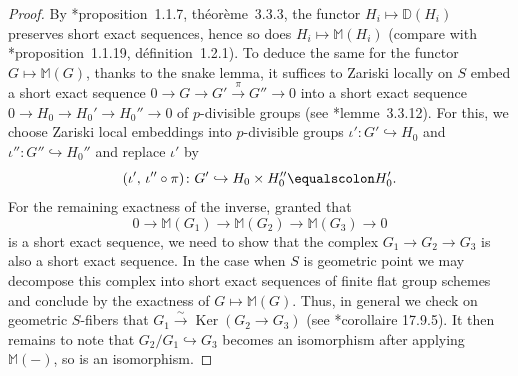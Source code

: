 \documentclass[11pt, reqno]{amsart}
\newcommand{\bD}{\mathbb{D}}
\newcommand{\bM}{\mathbb{M}}
\newcommand{\bZ}{\mathbb{Z}}
\DeclareMathOperator{\Ker}{Ker}		%
\newcommand{\cris}{{\mathrm{cris}}}		%
\newcommand{\et}{\mathrm{\acute{e}t}}	%
\newcommand{\hra}{\hookrightarrow}
\newcommand{\isomto}{\overset{\sim}{\longrightarrow}}
\newcommand{\ra}{\rightarrow}
\newcommand{\surjects}{\twoheadrightarrow}
\newcommand{\xra}{\xrightarrow}
\newcommand{\bpf}{\begin{proof}}
\newcommand{\epf}{\end{proof}}
\numberwithin{equation}{numberingbase}
\theoremstyle{thms}
\theoremstyle{claims}
\theoremstyle{defs}
\theoremstyle{thms}
\theoremstyle{defs}
\theoremstyle{subsection-tweak}
\theoremstyle{subsection-tweak}
\begin{document}
\bpf
By \cite{BBM82}*{proposition~1.1.7, th\'{e}or\`{e}me~3.3.3}, the functor $H_i \mapsto \bD(H_i)$ preserves short exact sequences, hence so does $H_i \mapsto \bM(H_i)$ (compare with \cite{BBM82}*{proposition~1.1.19, d\'{e}finition~1.2.1}). %
To deduce the same for the functor $G \mapsto \bM(G)$, thanks to the snake lemma, it suffices to Zariski locally on $S$ embed a short exact sequence $0 \ra G \ra G' \xra{\pi} G'' \ra 0$ into a short exact sequence $0 \ra H_0 \ra H_0' \ra H_0'' \ra 0$ of $p$-divisible groups (see \cite{BBM82}*{lemme~3.3.12}). For this, we choose Zariski local embeddings into $p$-divisible groups $\iota'\colon G' \hra H_0$ and $\iota'' \colon G'' \hra H_0''$ and replace $\iota'$ by 
\[
(\iota',\, \iota''\circ \pi)\colon G' \hra  H_0 \times H_0'' \equalscolon H_0'.
\] 
For the remaining exactness of the inverse, granted that 
\[
0 \ra \bM(G_1) \ra \bM(G_2) \ra \bM(G_3) \ra 0
\]
is a short exact sequence, we need to show that the complex $G_1 \ra G_2 \ra G_3$ is also a short exact sequence. In the case when $S$ is geometric point we may decompose this complex into short exact sequences of finite flat group schemes and conclude by the exactness of $G \mapsto \bM(G)$. Thus, in general we check on   geometric $S$-fibers that $G_1 \isomto \Ker(G_2 \ra G_3)$ (see \cite{EGAIV4}*{corollaire 17.9.5}). It then remains to note that $G_2/G_1 \hra G_3$ becomes an isomorphism after applying $\bM(-)$, so is an isomorphism.
\epf
\end{document}
